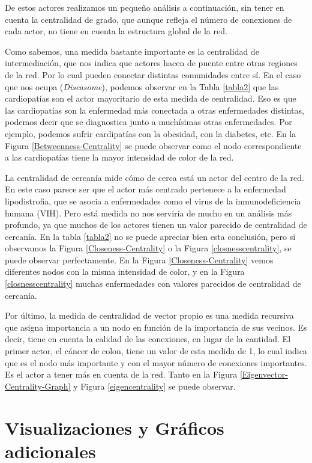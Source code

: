 \documentclass{uimppracticas}
\begin{document}
De estos actores realizamos un pequeño análisis a continuación, sin tener en cuenta la centralidad de grado, que aunque refleja el número de conexiones de cada actor, no tiene en cuenta la estructura global de la red.

Como sabemos, una medida bastante importante es la centralidad de intermediación, que nos indica que actores hacen de puente entre otras regiones de la red. Por lo cual pueden conectar distintas comunidades entre sí. En el caso que nos ocupa (\textit{Diseasome}), podemos observar en la Tabla \ref{tabla2} que las cardiopatías son el actor mayoritario de esta medida de centralidad. Eso es que las cardiopatías son la enfermedad más conectada a otras enfermedades distintas, podemos decir que se diagnostica junto a muchísimas otras enfermedades. Por ejemplo, podemos sufrir cardipatías con la obesidad, con la diabetes, etc. En la Figura \ref{Betweenness-Centrality} se puede observar como el nodo correspondiente a las cardiopatías tiene la mayor intensidad de color de la red.

La centralidad de cercanía mide cómo de cerca está un actor del centro de la red. En este caso parece ser que el actor más centrado pertenece a la enfermedad lipodistrofia, que se asocia a enfermedades como el virus de la inmunodeficiencia humana (VIH). Pero está medida no nos serviría de mucho en un análisis más profundo, ya que muchos de los actores tienen un valor parecido de centralidad de cercanía. En la tabla \ref{tabla2} no se puede apreciar bien esta conclusión, pero si observamos la Figura \ref{Closeness-Centrality} o la Figura \ref{closnesscentrality}, se puede observar perfectamente. En la Figura \ref{Closeness-Centrality} vemos diferentes nodos con la misma intensidad de color, y en la Figura \ref{closnesscentrality} muchas enfermedades con valores parecidos de centralidad de cercanía.

Por último, la medida de centralidad de vector propio es una medida recursiva que asigna importancia a un nodo en función de la importancia de sus vecinos. Es decir, tiene en cuenta la calidad de las conexiones, en lugar de la cantidad. El primer actor, el cáncer de colon, tiene un valor de esta medida de 1, lo cual indica que es el nodo más importante y con el mayor número de conexiones importantes. Es el actor a tener más en cuenta de la red. Tanto en la Figura \ref{Eigenvector-Centrality-Graph} y Figura \ref{eigencentrality} se puede observar.

\newpage

\section*{Visualizaciones y Gráficos adicionales}
\end{document}

